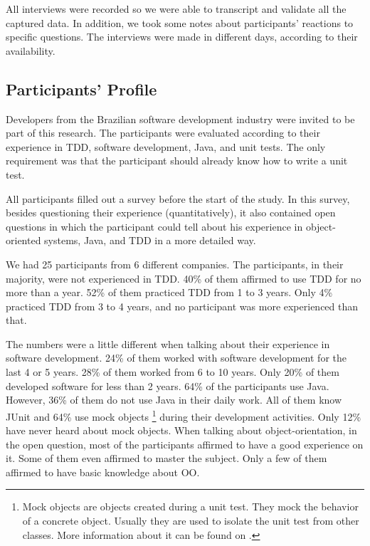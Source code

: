\documentclass[times]{speauth}
\begin{document}
All interviews were recorded so we were able to transcript and validate all
the captured data. In addition, we took some notes about participants' reactions
to specific questions. The interviews were made in different days,
according to their availability.

\subsection{Participants' Profile}
\label{sec:planejamento-participantes}

Developers from the Brazilian software development industry were invited to be part
of this research. The participants were evaluated according to their experience in TDD,
software development, Java, and unit tests. The only requirement was that the participant
should already know how to write a unit test.

All participants filled out a survey before the start of the study. In this survey,
besides questioning their experience (quantitatively), it also contained open questions in which
the participant could tell about his experience in object-oriented systems, Java, and
TDD in a more detailed way.

We had 25 participants from 6 different companies. The participants, in their majority,
were not experienced in TDD. 40\% of them affirmed to use TDD for no more than a year.
52\% of them practiced TDD from 1 to 3 years. Only 4\% practiced TDD from 3 to 4
years, and no participant was more experienced than that.

The numbers were a little different when talking about their experience in software
development. 24\% of them worked with software development for the last 4 or 5 years.
28\% of them worked from 6 to 10 years. Only 20\% of them developed software for less
than 2 years. 64\% of the participants use Java. However, 36\% of them do not use
Java in their daily work. All of them know JUnit and 64\% use mock objects 
\footnote{Mock objects are objects created during a unit test. They mock the behavior 
of a concrete object. Usually they are used to isolate the unit test from other classes. 
More information about it can be found on \cite{mocks}.}
during their development activities.
Only 12\% have never heard about mock objects. When talking about object-orientation,
in the open question, most of the participants affirmed to have a good experience
on it. Some of them even affirmed to master the subject. Only a few of them affirmed
to have basic knowledge about OO.
\end{document}
